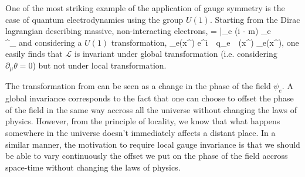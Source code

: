     One of the most striking example of the application of gauge symmetry is the case of
    quantum electrodynamics using the group $U(1)$. Starting from the Dirac lagrangian
    describing massive, non-interacting electrons,
    {
        =
        \bar{\psi_e} (i \dslash - m) \psi_e
        \,\,\,\,\,\,\,
        \,\,\,\,\,\,\,
        \dslash {} \gamma^\mu \partial_\mu
    }
    and considering a $U(1)$ transformation,
    {
        \psi_e(x^\mu)
        \rightarrow
        e^{i \,\cdot\, q_e \,\cdot\, \theta(x^\mu)} \psi_e(x^\mu),
    }
    one easily finds that $\mathcal{L}$ is invariant under global transformation (i.e.
    considering $\partial_\mu \theta = 0$) but not under local transformation.

    The transformation from  can be seen as a change in the phase of the field
    $\psi_e$. A global invariance corresponds to the fact that one can choose to offset
    the phase of the field in the same way accross all the universe without changing the
    laws of physics. However, from the principle of locality, we know that what happens
    somewhere in the universe doesn't immediately affects a distant place. In a similar
    manner, the motivation to require local gauge invariance is that we should be able to
    vary continuously the offset we put on the phase of the field accross space-time
    without changing the laws of physics.

